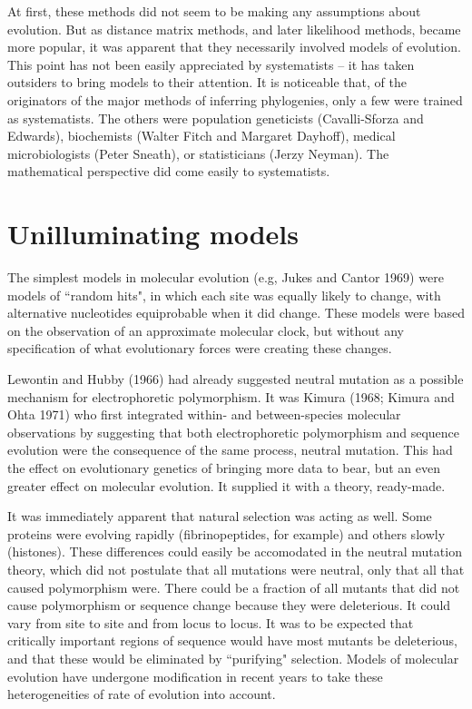 \documentclass[12pt]{article}
\begin{document}
At first, these methods did not seem to be making any assumptions about
evolution.  But as distance matrix methods, and later likelihood methods,
became more popular, it was apparent that they necessarily involved models
of evolution.  This point has not been easily appreciated by systematists --
it has taken outsiders to bring models to their attention.  It is noticeable
that, of the originators of the major methods of inferring phylogenies, only
a few were trained as systematists.
The others were population geneticists
(Cavalli-Sforza and Edwards), biochemists (Walter Fitch and Margaret
Dayhoff), medical microbiologists (Peter Sneath), or statisticians (Jerzy
Neyman).  The mathematical perspective did come easily to systematists.

\section*{Unilluminating models}

The simplest models in molecular evolution (e.g, Jukes and
Cantor 1969) were models of ``random hits", in which each site was equally
likely to change, with alternative nucleotides equiprobable when it did change.
These models were based on the observation of an approximate molecular
clock, but without any specification of what evolutionary forces were
creating these changes.

Lewontin and Hubby (1966) had already suggested neutral mutation as a
possible mechanism for electrophoretic polymorphism.  It was Kimura (1968;
Kimura and Ohta 1971) who first integrated within- and between-species
molecular observations by suggesting that both electrophoretic polymorphism
and sequence evolution were the consequence of the same process, neutral
mutation.  This had the effect on evolutionary genetics of bringing more
data to bear, but an even greater effect on molecular evolution.  It supplied
it with a theory, ready-made.

It was immediately apparent that natural selection was acting as well.
Some proteins were evolving rapidly (fibrinopeptides, for example) and
others slowly (histones).  These differences could easily be accomodated
in the neutral mutation theory, which did not postulate that all mutations
were neutral, only that all that caused polymorphism were.  There could
be a fraction of all mutants that did not cause polymorphism
or sequence change because they were deleterious.  It could vary from
site to site and from locus to locus.  It was to be expected that
critically important regions of sequence would have most mutants be
deleterious, and that these would be eliminated by ``purifying" selection.
Models of molecular evolution have undergone modification in recent
years to take these heterogeneities of rate of evolution into account.
\end{document}
